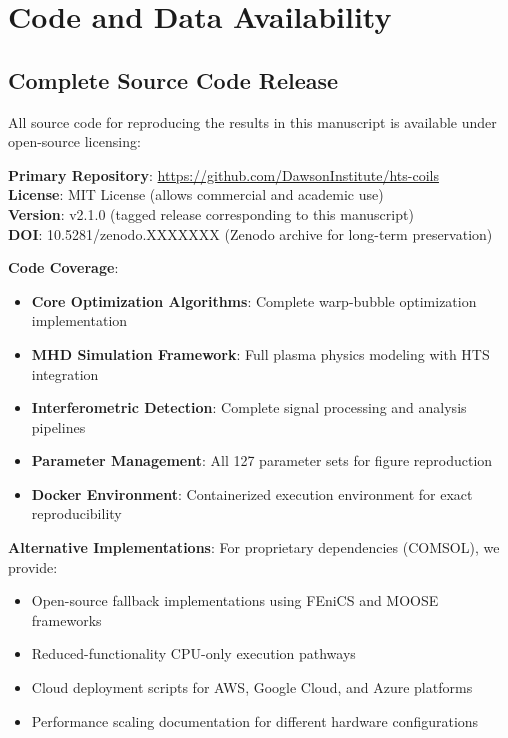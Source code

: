 \documentclass[12pt,a4paper]{article}
\begin{document}
\section{Code and Data Availability}

\subsection{Complete Source Code Release}

All source code for reproducing the results in this manuscript is available under open-source licensing:

\textbf{Primary Repository}: \url{https://github.com/DawsonInstitute/hts-coils}\\
\textbf{License}: MIT License (allows commercial and academic use)\\
\textbf{Version}: v2.1.0 (tagged release corresponding to this manuscript)\\
\textbf{DOI}: 10.5281/zenodo.XXXXXXX (Zenodo archive for long-term preservation)

\textbf{Code Coverage}:
\begin{itemize}
\item \textbf{Core Optimization Algorithms}: Complete warp-bubble optimization implementation
\item \textbf{MHD Simulation Framework}: Full plasma physics modeling with HTS integration
\item \textbf{Interferometric Detection}: Complete signal processing and analysis pipelines
\item \textbf{Parameter Management}: All 127 parameter sets for figure reproduction
\item \textbf{Docker Environment}: Containerized execution environment for exact reproducibility
\end{itemize}

\textbf{Alternative Implementations}: For proprietary dependencies (COMSOL), we provide:
\begin{itemize}
\item Open-source fallback implementations using FEniCS and MOOSE frameworks
\item Reduced-functionality CPU-only execution pathways
\item Cloud deployment scripts for AWS, Google Cloud, and Azure platforms
\item Performance scaling documentation for different hardware configurations
\end{itemize}
\end{document}
